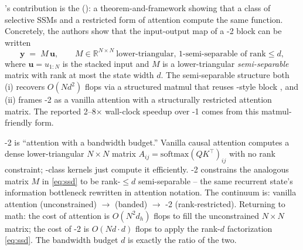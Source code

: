 \citet{mamba2}'s contribution is the \emph{} ():
a theorem-and-framework showing that a class of selective SSMs and a
restricted form of attention compute the same function. Concretely, the
authors show that the input-output map of a -2 block can be
written
\begin{equation}
  \boldsymbol{y} \;=\; M\,\boldsymbol{u},
  \qquad
  M \in \mathbb{R}^{N \times N}\ \text{lower-triangular,
  $1$-semi-separable of rank}\le d,
  \label{eq:ssd}
\end{equation}
where $\boldsymbol{u} = u_{1:N}$ is the stacked input and $M$ is a
lower-triangular \emph{semi-separable} matrix with rank at most the 
state width $d$. The semi-separable structure both (i) recovers
$O(N d^2)$ flops via a structured matmul that reuses
-style block , and (ii) frames -2 as a vanilla
attention with a structurally restricted attention matrix. The reported
2--8$\times$ wall-clock speedup over -1 comes from this
matmul-friendly form.

\begin{analogy}
-2 is ``attention with a bandwidth budget.'' Vanilla causal
attention computes a dense lower-triangular $N \times N$
matrix $A_{ij} = \mathrm{softmax}(QK^\top)_{ij}$ with no rank
constraint; -class kernels just compute it efficiently.
-2 constrains the analogous matrix $M$ in \eqref{eq:ssd} to be
rank-$\le d$ semi-separable -- the same recurrent state's information
bottleneck rewritten in attention notation. The continuum is: vanilla
attention (unconstrained) $\to$  (banded) $\to$
-2 (rank-restricted). Returning to math: the cost of attention is
$O(N^2 d_h)$ flops to fill the unconstrained $N \times N$ matrix; the
cost of -2 is $O(N d \cdot d)$ flops to apply the rank-$d$
factorization \eqref{eq:ssd}. The bandwidth budget $d$ is exactly the
ratio of the two.
\end{analogy}

